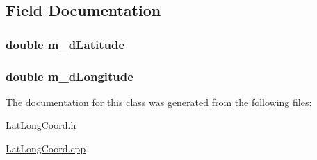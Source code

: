 \subsection{Field Documentation}
\hypertarget{a00006_a1cdacb6dc826cc93ec04bba718cf834e}{
\subsubsection[{m\-\_\-d\-Latitude}]{\setlength{\rightskip}{0pt plus 5cm}double m\-\_\-d\-Latitude\hspace{0.3cm}{\ttfamily [private]}}}\label{a00006_a1cdacb6dc826cc93ec04bba718cf834e}
\hypertarget{a00006_a0b4613cfb4daeaf293a64de8ed38638b}{
\subsubsection[{m\-\_\-d\-Longitude}]{\setlength{\rightskip}{0pt plus 5cm}double m\-\_\-d\-Longitude\hspace{0.3cm}{\ttfamily [private]}}}\label{a00006_a0b4613cfb4daeaf293a64de8ed38638b}


The documentation for this class was generated from the following files\-:\begin{DoxyCompactItemize}
\item 
\hyperlink{a00024}{Lat\-Long\-Coord.\-h}\item 
\hyperlink{a00023}{Lat\-Long\-Coord.\-cpp}\end{DoxyCompactItemize}
